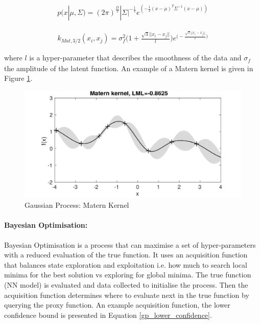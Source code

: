 \documentclass[11pt,twoside]{report}
\begin{document}
\begin{equation}
\begin{aligned}
p(x|\mu,\Sigma) = (2 \pi)^{\frac{D}{2}} | \Sigma|^{- \frac{1}{2}} e^{(- \frac{1}{2}(x- \mu)^{T} \Sigma^{-1}(x- \mu))}
\end{aligned}
\label{gaus_dist}
\end{equation}


\begin{equation}
\begin{aligned}
k_{Mat,3/2}(x_{i},x_{j}) = 
\sigma_{f}^{2} \bigg ( 1 + 
\frac{\sqrt{3}||x_{i}-x_{j}||}{\mathit{l}} \bigg )e^{ \big (-\frac{\sqrt{3}||x_{i}-x_{j}||}{\mathit{l}} \big )}
\end{aligned}
\label{matern}
\end{equation}

where $\mathit{l}$ is a hyper-parameter that describes the smoothness of the data and $\mathit{\sigma_{f}}$ the amplitude of the latent function. An example of a Matern kernel is given in Figure \ref{matern_kernel_fig}.


\noindent \begin{figure}[h!]
	\includegraphics[width = 1.0\hsize]{./figures/Matern_Kernel.png}
	\caption{Gaussian Process: Matern Kernel \cite{Marc_Deisenroth_Notes}}
	\label{matern_kernel_fig}
\end{figure}

\paragraph{Bayesian Optimisation:}
Bayesian Optimisation is a process that can maximise a set of hyper-parameters with a reduced evaluation of the true function. It uses an acquisition function that balances state exploration and exploitation i.e. how much to search local minima for the best solution vs exploring for global minima. The true function (NN model) is evaluated and data collected to initialise the process. Then the acquisition function determines where to evaluate next in the true function by querying the proxy function. An example acquisition function, the lower confidence bound \cite{SrinivasNiranjan2010GPOi} is presented in Equation \ref{gp_lower_confidence}.
\end{document}
